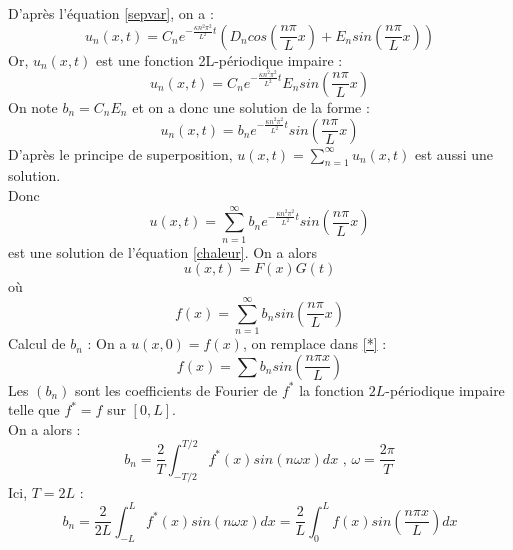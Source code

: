 \documentclass[a4paper,12pt]{report}
\begin{document}
D'apr\`es l'\'equation \eqref{sepvar}, on a :
\begin{equation}\label{sepvar2}
u_{n}(x,t) = C_{n}e^{-\frac{\kappa n^{2}\pi^{2}}{L^{2}}t}(D_{n}cos(\frac{n\pi}{L}x) + E_{n}sin(\frac{n\pi}{L}x))
\end{equation}
Or, $u_{n}(x,t)$ est une fonction 2L-p\'eriodique impaire :
\begin{equation}
u_{n}(x,t) = C_{n}e^{-\frac{\kappa n^{2}\pi^{2}}{L^{2}}t}E_{n}sin(\frac{n\pi}{L}x)
\end{equation}
On note $b_{n} = C_{n}E_{n}$ et on a donc une solution de la forme :
\begin{equation}
u_{n}(x,t) = b_{n}e^{-\frac{\kappa n^{2}\pi^{2}}{L^{2}}t}sin(\frac{n\pi}{L}x)
\end{equation}
D'apr\`es le principe de superposition, $u(x,t) = \sum\limits_{n=1}^{\infty} u_{n}(x,t)$ est aussi une solution.\\
Donc 
\begin{equation}\label{*}
u(x,t) = \sum_{n=1}^{\infty} b_{n}e^{-\frac{\kappa n^{2}\pi^{2}}{L^{2}}t}sin(\frac{n\pi}{L}x)
\end{equation}
est une solution de l'\'equation \eqref{chaleur}.
On a alors 
\begin{equation}
u(x,t) = F(x)G(t)
\end{equation}
o\`u \[f(x)=\sum_{n=1}^{\infty} b_{n}sin(\frac{n\pi}{L}x)\]
\newpage
Calcul de $b_{n}$ :
On a $u(x,0)=f(x)$, on remplace dans \eqref{*} :
\begin{equation}
f(x) = \sum b_{n}sin(\frac{n\pi x}{L})
\end{equation}
Les $(b_{n})$ sont les coefficients de Fourier de $f^{*}$ la fonction $2L$-p\'eriodique impaire telle que $f^{*}=f$ sur $[0,L]$.\\
On a alors :
\begin{equation}
b_{n} = \frac{2}{T}\displaystyle{\displaystyle\int_{-T/2}^{T/2}}f^{*}(x)sin(n\omega x)dx\text{ , } \omega = \frac{2\pi}{T}
\end{equation}
Ici, $T = 2L$ :
\begin{equation}
b_{n} = \frac{2}{2L}\displaystyle\int_{-L}^{L}f^{*}(x)sin(n\omega x)dx = \frac{2}{L}\displaystyle\int_{0}^{L}f(x)sin(\frac{n\pi x}{L})dx
\end{equation}
\newpage
\end{document}
